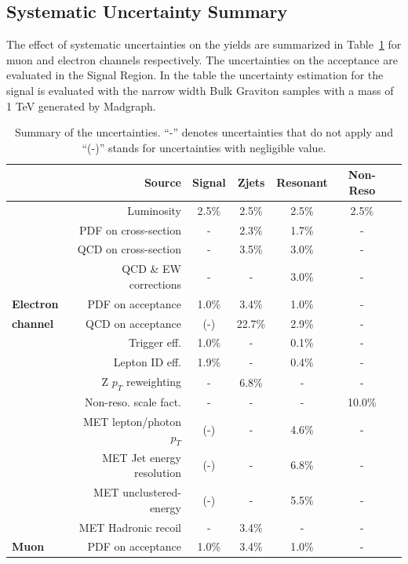 \subsection{Systematic Uncertainty Summary}
The effect of systematic uncertainties on the yields are summarized in Table~\ref{tab:unc_summary} for muon and electron channels respectively. The uncertainties on the acceptance are evaluated in the Signal Region. In the table the uncertainty estimation for the signal is evaluated with the narrow width Bulk Graviton samples with a mass of 1 TeV generated by Madgraph.
\begin{table}[htbp]
\caption{Summary of the uncertainties. ``-'' denotes uncertainties that do not apply and ``(-)'' stands for uncertainties with negligible value.} 
\label{tab:unc_summary}
\begin{center}
\begin{footnotesize}
\begin{tabular}{l r c c c c c }
\hline\hline
%
{}	&	Source				&	Signal 	&	Zjets		&	Resonant		&	Non-Reso 				\\ \hline\hline
{}	&	Luminosity			&	2.5\%	&	2.5\%		&	2.5\%			&	2.5\%					\\
{}	&	PDF on cross-section		&	-	&	2.3\%		&	1.7\%			&	-						\\
{}	&	QCD on cross-section		&	-	&	3.5\%		&	3.0\%			&	-						\\
{}	&	QCD \& EW corrections		&	-	&	-		&	3.0\%			&	-						\\
\hline\hline
{\bf Electron}&PDF on acceptance		&	1.0\%	&	3.4\%		&	1.0\%			&	-						\\
{\bf channel}&QCD on acceptance			&  	(-)	&	22.7\%		&	2.9\%			&	-						\\ 
{}	&	Trigger eff.			&	1.0\%	&	-		&	0.1\%			&	-						\\
{}	&	Lepton ID eff.			&	1.9\%	&	-		&	0.4\%			&	-						\\
{}	&	Z $p_T$ reweighting		&	-	&	6.8\%		&	-			&	-						\\
{}	&	Non-reso. scale fact.		&	-	&	-		&	-			&	10.0\%					\\ 
{}	&	MET lepton/photon $p_T$ 	&	(-)	&	-		&	4.6\%			&	-						\\
{}	&	MET Jet energy resolution	&	(-)	&	-		&	6.8\%			&	-						\\
{}	&	MET unclustered-energy		&	(-)	&	-		&	5.5\%			&	-						\\
{}	&	MET Hadronic recoil		&	-	&	3.4\%		&	-			&	-						\\ 
\hline\hline
{\bf Muon}&PDF on acceptance			&	1.0\%	&	3.4\%		&	1.0\%			&	-						\\

\end{tabular}
\end{footnotesize}
\end{center}
\end{table}

